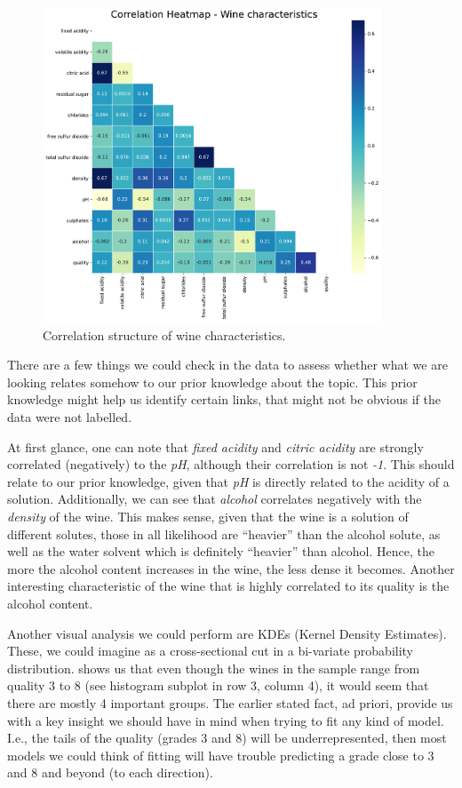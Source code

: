 \documentclass[11pt]{article}
\begin{document}
\begin{figure}[h!]
    \centering
    \includegraphics[width=0.9\textwidth]{figs/wine_heatmap}
    \caption{Correlation structure of wine characteristics.}
    \label{fig:wine_heatmap}
\end{figure}


There are a few things we could check in the data to assess whether what we are looking relates somehow
to our prior knowledge about the topic.
This prior knowledge might help us identify certain links, that might not be obvious if the data were not labelled.

At first glance, one can note that \emph{fixed acidity} and \emph{citric acidity} are strongly correlated (negatively) to the \emph{pH},
although their correlation is not \emph{-1}.
This should relate to our prior knowledge, given that \emph{pH} is directly related to the acidity of a
solution.
Additionally, we can see that \emph{alcohol} correlates negatively with the \emph{density} of the wine.
This makes sense, given that the wine is a solution of different solutes, those in all likelihood are ``heavier''
than the alcohol solute, as well as the water solvent which is definitely ``heavier'' than alcohol.
Hence, the more the alcohol content increases in the wine, the less dense it becomes.
Another interesting characteristic of the wine that is highly correlated to its quality is the
alcohol content.

\vspace{2pt}
Another visual analysis we could perform are KDEs (Kernel Density Estimates).
These, we could imagine as a cross-sectional cut in a bi-variate probability distribution.
 shows us that even though the wines in the sample range from quality 3 to 8
(see histogram subplot in row 3, column 4), it would seem that there are mostly 4 important groups.
The earlier stated fact, ad priori, provide us with a key insight we should have in mind when trying
to fit any kind of model.
I.e., the tails of the quality (grades 3 and 8) will be underrepresented, then most models we could think
of fitting will have trouble predicting a grade close to 3 and 8 and beyond (to each direction).
\end{document}
